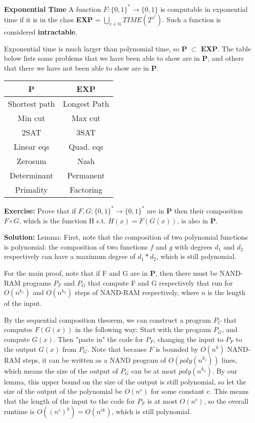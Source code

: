 \documentclass[11pt]{article}
\theoremstyle{definition}
\theoremstyle{remark}
\begin{document}
\textbf{Exponential Time} A function $F:\{0,1\}^* \rightarrow \{0,1 \}$ is computable in exponential time if it is in the class \textbf{EXP} = $\bigcup_{c \in \mathbb{N}} TIME(2^{n^c})$. Such a function is considered \textbf{intractable}.

Exponential time is much larger than polynomial time, so \textbf{P} $\subset$ \textbf{EXP}. The table below lists some problems that we have been able to show are in \textbf{P}, and others that there we have not been able to show are in \textbf{P}. 

\begin{center}
\begin{tabular}{ c|c} 
P & EXP \\
 \hline
Shortest path &	Longest Path \\
Min cut&		Max cut \\
2SAT&		3SAT \\
Linear eqs	 &	Quad. eqs \\
Zerosum	&	 Nash \\
Determinant	&	Permanent\\ 
Primality	&	Factoring \\ 
\end{tabular}
\end{center}

\noindent \textbf{Exercise:} Prove that if $F, G:\{0,1\}^* \rightarrow \{0,1 \}^*$ are in \textbf{P} then their composition $F \circ G$, which is the function H s.t. $H(x)=F(G(x))$, is also in \textbf{P}.

\textbf{Solution:} 
Lemma: First, note that the composition of two polynomial functions is polynomial: the composition of two functions $f$ and $g$ with degrees $d_1$ and $d_2$ respectively can have a maximum degree of $d_1 * d_2$, which is still polynomial.

For the main proof, note that if F and G are in \textbf{P}, then there must be NAND-RAM programs $P_F$ and $P_G$ that compute F and G respectively that run for $O(n^{k_1})$ and $O(n^{k_2})$ steps of NAND-RAM respectively, where $n$ is the length of the input. 

By the sequential composition theorem, we can construct a program $P_C$ that computes $F(G(x))$ in the following way: Start with the program $P_G$, and compute $G(x)$. Then "paste in" the code for $P_F$, changing the input to $P_F$ to the output $G(x)$ from $P_G$. Note that because $F$ is bounded by $O(n^k)$ NAND-RAM steps, it can be written as a NAND program of $O(poly(n^{k_1}))$ lines, which means the size of the output of $P_G$ can be at most $poly(n^{k_2})$. By our lemma, this upper bound on the size of the output is still polynomial, so let the size of the output of the polynomial be $O(n^c)$ for some  constant c. This means that the length of the input to the code for $P_F$ is at most $O(n^c)$, so the overall runtime is $O((n^c)^k) = O(n^{ck})$, which is still polynomial.
\end{document}
